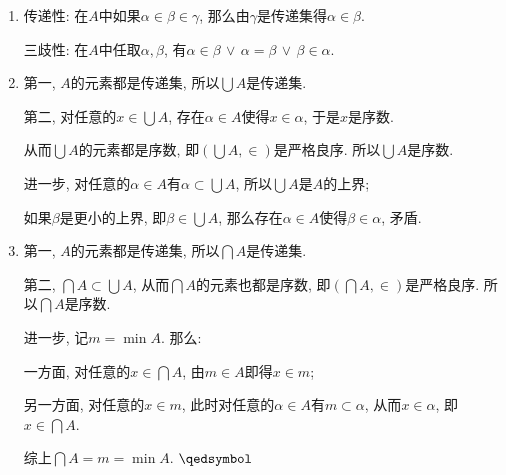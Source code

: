 \documentclass[UTF8]{ctexart}
\begin{document}
\begin{enumerate}
    \item 传递性: 在$A$中如果$\alpha\in\beta\in\gamma$,
    那么由$\gamma$是传递集得$\alpha\in\beta$.

    \hspace{2.17em}
    三歧性: 在$A$中任取$\alpha,\beta$,
    有$\alpha\in\beta\,\lor\,\alpha=\beta\,\lor\,\beta\in\alpha$.

    \item 第一, $A$的元素都是传递集, 所以$\displaystyle\bigcup A$是传递集.
    
    \vspace{3pt}\hspace{2.17em}
    第二, 对任意的$\displaystyle x\in\bigcup A$, 存在$\alpha\in A$使得$x\in\alpha$,
    于是$x$是序数.
    
    \vspace{3pt}\hspace{2.17em}
    从而$\displaystyle\bigcup A$的元素都是序数,
    即$\displaystyle\left(\bigcup A,\in\right)$是严格良序.
    所以$\displaystyle\bigcup A$是序数.

    \vspace{3pt}\hspace{2.17em}
    进一步, 对任意的$\alpha\in A$有$\displaystyle\alpha\subset\bigcup A$,
    所以$\displaystyle\bigcup A$是$A$的上界;

    \vspace{3pt}\hspace{2.17em}
    如果$\beta$是更小的上界, 即$\displaystyle\beta\in\bigcup A$,
    那么存在$\alpha\in A$使得$\beta\in\alpha$, 矛盾.

    \vspace{3pt}
    \item 第一, $A$的元素都是传递集, 所以$\displaystyle\bigcap A$是传递集.
    
    \vspace{3pt}\hspace{2.17em}
    第二, $\displaystyle\bigcap A\subset\bigcup A$,
    从而$\displaystyle\bigcap A$的元素也都是序数,
    即$\displaystyle\left(\bigcap A,\in\right)$是严格良序.
    所以$\displaystyle\bigcap A$是序数.

    \vspace{3pt}\hspace{2.17em}
    进一步, 记$m=\min A$. 那么:

    \vspace{3pt}\hspace{2.17em}
    一方面, 对任意的$\displaystyle x\in\bigcap A$, 由$m\in A$即得$x\in m$;

    \vspace{3pt}\hspace{2.17em}
    另一方面, 对任意的$x\in m$, 此时对任意的$\alpha\in A$有$m\subset\alpha$,
    从而$x\in\alpha$, 即$\displaystyle x\in\bigcap A$.
    
    \vspace{3pt}\hspace{2.17em}
    综上$\displaystyle\bigcap A=m=\min A$. \hfill $\qedsymbol$
\end{enumerate}
\end{document}
